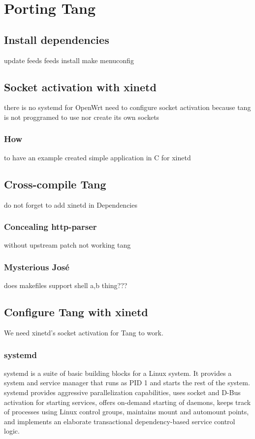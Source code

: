 \chapter{Porting Tang}\label{porting-tang}

\section{Install dependencies}

update feeds
feeds install
make menuconfig
\newpage

\section{Socket activation with xinetd}

there is no systemd for OpenWrt
need to configure socket activation because tang is not proggramed to use nor create its own sockets
\subsection{How }

to have an example created simple application in C for xinetd
\newpage

\section{Cross-compile Tang}

do not forget to add xinetd in Dependencies
\newpage

\subsection{Concealing http-parser}

without upstream patch not working tang
\newpage

\subsection{Mysterious José}

does makefiles support shell {a,b} thing???
\newpage

\section{Configure Tang with xinetd}

We need xinetd's socket activation for Tang to work.

\subsection{systemd}\label{systemd} %
systemd is a suite of basic building blocks for a Linux system.
It provides a system and service manager that runs as PID 1 and starts the rest of the system.
systemd provides aggressive parallelization capabilities, uses socket and D-Bus activation for starting services,
 offers on-demand starting of daemons, keeps track of processes using Linux control groups, maintains mount and automount points,
 and implements an elaborate transactional dependency-based service control logic.

